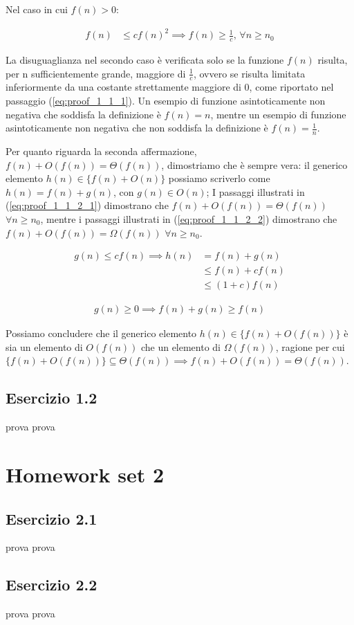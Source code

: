\documentclass{article}
\begin{document}
\noindent
Nel caso in cui $f(n) > 0$:

\begin{equation} \label{eq:proof_1_1_1}
\begin{aligned}
f(n) &\le cf(n)^2 \implies f(n) \ge \frac{1}{c} \text{,  } \forall n \ge n_0
\end{aligned}
\end{equation}

\noindent
La disuguaglianza nel secondo caso è verificata solo se la funzione $f(n)$ risulta, per n sufficientemente grande, maggiore di $\frac{1}{c}$, ovvero se risulta limitata inferiormente da una costante strettamente maggiore di 0, come riportato nel passaggio (\ref{eq:proof_1_1_1}).
Un esempio di funzione asintoticamente non negativa che soddisfa la definizione è $f(n) = n$, mentre un esempio di funzione asintoticamente non negativa che non soddisfa la definizione è $f(n) = \frac{1}{n}$.
\vspace{\baselineskip}

\noindent
Per quanto riguarda la seconda affermazione, $f(n) + O(f(n)) =  \Theta(f(n))$, dimostriamo che è sempre vera: il generico elemento $h(n) \in \{f(n) + O(n)\}$ possiamo scriverlo come $h(n) = f(n) + g(n)$, con $g(n) \in O(n)$; I passaggi illustrati in  (\ref{eq:proof_1_1_2_1}) dimostrano che $f(n) + O(f(n)) = \Theta(f(n))$ $\forall n \ge n_0$, mentre i passaggi illustrati in (\ref{eq:proof_1_1_2_2}) dimostrano che $f(n) + O(f(n)) = \Omega(f(n))$ $\forall n \ge n_0$. 

\begin{equation} \label{eq:proof_1_1_2_1}
\begin{aligned}
g(n) \le cf(n) \implies h(n) &= f(n) + g(n) \\ &\le f(n) + cf(n) \\ 
&\le (1+c)f(n) 
\end{aligned}
\end{equation}

\begin{equation} \label{eq:proof_1_1_2_2}
\begin{aligned}
g(n) \ge 0 \implies f(n) + g(n) \ge f(n)
\end{aligned}
\end{equation}

\noindent
Possiamo concludere che il generico elemento $h(n) \in \{f(n)+O(f(n))\}$ è sia un elemento di $O(f(n))$ che un elemento di $\Omega(f(n))$, ragione per cui $\{f(n)+O(f(n))\} \subseteq {\Theta(f(n))} \implies f(n) + O(f(n)) = \Theta(f(n))$.


\subsection{Esercizio 1.2} \label{subsec:esercizio1_2}
prova prova
\section{Homework set 2} \label{sec:homework_2}%
\subsection{Esercizio 2.1} \label{subsec:esercizio2_1}
prova prova
\subsection{Esercizio 2.2} \label{subsec:esercizio2_2}
prova prova
\end{document}
